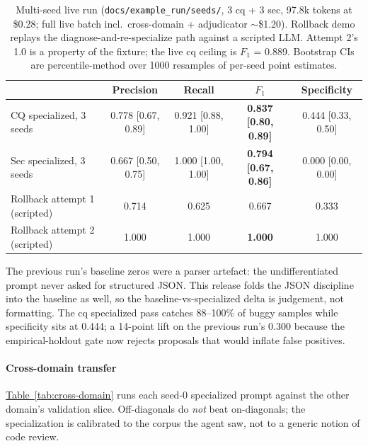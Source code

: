 \documentclass[11pt,a4paper]{article}
\newcommand{\tabref}[1]{\hyperref[#1]{Table~\ref*{#1}}}
\begin{document}
\begin{table}[!htbp]
\small
\centering
\begin{tabular}{@{}lcccc@{}}
\toprule
 & \textbf{Precision} & \textbf{Recall} & \textbf{$F_1$} & \textbf{Specificity} \\
\midrule
CQ specialized, 3 seeds & 0.778 [0.67, 0.89] & 0.921 [0.88, 1.00] & \textbf{0.837 [0.80, 0.89]} & 0.444 [0.33, 0.50] \\
Sec specialized, 3 seeds & 0.667 [0.50, 0.75] & 1.000 [1.00, 1.00] & \textbf{0.794 [0.67, 0.86]} & 0.000 [0.00, 0.00] \\
\midrule
Rollback attempt 1 (scripted) & 0.714 & 0.625 & 0.667 & 0.333 \\
Rollback attempt 2 (scripted) & 1.000 & 1.000 & \textbf{1.000} & 1.000 \\
\bottomrule
\end{tabular}
\captionsetup{skip=1pt}
\caption{Multi-seed live run (\texttt{docs/example\_run/seeds/}, 3 cq + 3 sec, 97.8k tokens at \$0.28; full live batch incl.\ cross-domain + adjudicator $\sim$\$1.20). Rollback demo replays the diagnose-and-re-specialize path against a scripted LLM. Attempt 2's 1.0 is a property of the fixture; the live cq ceiling is $F_1$ = 0.889. Bootstrap CIs are percentile-method over 1000 resamples of per-seed point estimates.}
\label{tab:results}
\end{table}

The previous run's baseline zeros were a parser artefact: the undifferentiated prompt never asked for structured JSON. This release folds the JSON discipline into the baseline as well, so the baseline-vs-specialized delta is judgement, not formatting. The cq specialized pass catches 88--100\% of buggy samples while specificity sits at 0.444; a 14-point lift on the previous run's 0.300 because the empirical-holdout gate now rejects proposals that would inflate false positives.

\paragraph{Cross-domain transfer} \tabref{tab:cross-domain} runs each seed-0 specialized prompt against the other domain's validation slice. Off-diagonals do \emph{not} beat on-diagonals; the specialization is calibrated to the corpus the agent saw, not to a generic notion of code review.
\end{document}
